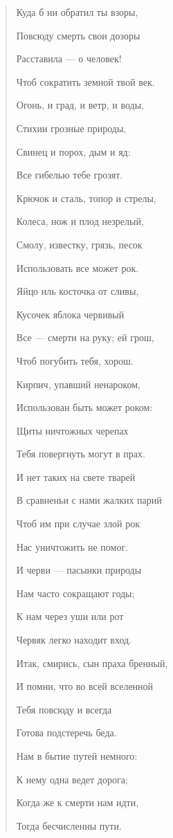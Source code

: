 \documentclass[12pt]{article}
\begin{document}
\begin{quote}
Куда б ни обратил ты взоры, 

Повсюду смерть свои дозоры 

Расставила --- о человек! 

Чтоб сократить земной твой век. 

Огонь, и град, и ветр, и воды, 

Стихии грозные природы, 

Свинец и порох, дым и яд: 

Все гибелью тебе грозят. 

Крючок и сталь, топор и стрелы, 

Колеса, нож и плод незрелый, 

Смолу, известку, грязь, песок 

Использовать все может рок. 

Яйцо иль косточка от сливы, 

Кусочек яблока червивый 

Все --- смерти на руку; ей грош, 

Чтоб погубить тебя, хорош. 

Кирпич, упавший ненароком, 

Использован быть может роком: 

Щиты ничтожных черепах 

Тебя повергнуть могут в прах. 

И нет таких на свете тварей 

В сравненьи с нами жалких парий 

Чтоб им при случае злой рок 

Нас уничтожить не помог. 

И черви --- пасынки природы 

Нам часто сокращают годы; 

К нам через уши или рот 

Червяк легко находит вход. 

Итак, смирись, сын праха бренный, 

И помни, что во всей вселенной 

Тебя повсюду и всегда 

Готова подстеречь беда. 

Нам в бытие путей немного: 

К нему одна ведет дорога; 

Когда же к смерти нам идти, 

Тогда бесчисленны пути. 

\end{quote}
\end{document}
